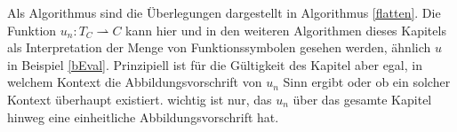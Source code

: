 \documentclass{scrartcl}
\numberwithin{figure}{section} %
\theoremstyle{definition} %
\begin{document}
Als Algorithmus sind die Überlegungen dargestellt in Algorithmus \ref{flatten}.
Die Funktion $u_n \colon T_C \rightharpoonup C$ kann hier und in den weiteren Algorithmen dieses Kapitels als \grqq{} Interpretation der Menge von Funktionssymbolen gesehen werden, ähnlich $u$ in Beispiel \ref{bEval}. Prinzipiell ist für die Gültigkeit des Kapitel aber egal, in welchem Kontext die Abbildungsvorschrift von $u_n$ Sinn ergibt oder ob ein solcher Kontext überhaupt existiert. wichtig ist nur, das $u_n$ über das gesamte Kapitel hinweg eine einheitliche Abbildungsvorschrift hat.

\begin{algorithm}
\DontPrintSemicolon
\caption{$\mathrm{flatten} \colon T \rightarrow T$}\label{flatten}

\end{algorithm}
\end{document}
